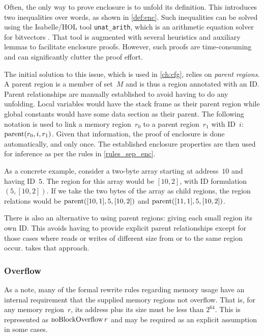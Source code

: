 Often, the only way to prove enclosure is to unfold its definition.
This introduces two inequalities over words, as shown in \cref{def:enc}.
Such inequalities can be solved using the Isabelle/HOL tool \lstinline{unat_arith}, which is an arithmetic equation solver for bitvectors \autocite{dawson2009isabelle,isabelle-word-session}.
That tool is augmented with several heuristics
and auxiliary lemmas to facilitate enclosure proofs.
However, such proofs are time-consuming
and can significantly clutter the proof effort.

The initial solution to this issue, which is used in \cref{ch:cfg},
relies on \emph{parent regions}.%
A parent region is a member of set~$M$ and is thus a region annotated with an ID.
Parent relationships are manually established to avoid having to do any unfolding.
Local variables would have the stack frame as their parent region
while global constants would have some data section as their parent.
The following notation is used to link a memory region~$r_0$
to a parent region~$r_1$ with ID~$i$: $\operatorname{parent}(r_0,i,r_1)$.
Given that information, the proof of enclosure is done automatically, and only once.
The established enclosure properties are then used for inference
as per the rules in \cref{rules_sep_enc}.

As a concrete example, consider a two-byte array starting at address~$10$
and having ID~$5$.
The region for this array would be $[10, 2]$, with ID formulation $(5, [10, 2])$.
If we take the two bytes of the array as child regions,
the region relations would be $\operatorname{parent}([10, 1],5,[10, 2])$
and $\operatorname{parent}([11, 1],5,[10, 2])$.

There is also an alternative to using parent regions:
giving each small region its own ID.
This avoids having to provide explicit parent relationships
except for those cases where reads or writes of different size
from or to the same region occur.
 takes that approach.

\subsubsection{Overflow}
As a note, many of the formal rewrite rules regarding memory usage
have an internal requirement that the supplied memory regions not overflow.
That is, for any memory region~$r$,
its address plus its size must be less than $2^{64}$.
This is represented as $\operatorname{noBlockOverflow} r$ and may be required as an explicit assumption
in some cases.

